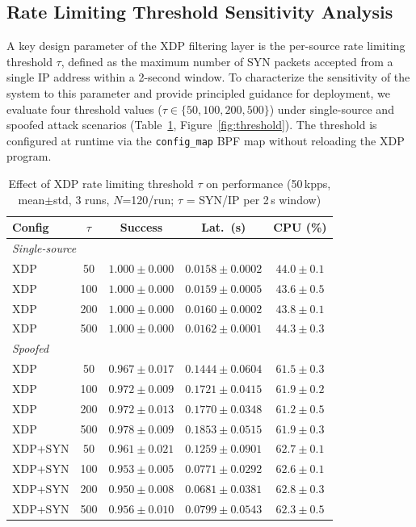 \documentclass[conference]{IEEEtran}
\begin{document}
\subsection{Rate Limiting Threshold Sensitivity Analysis}

A key design parameter of the XDP filtering layer is the per-source rate
limiting threshold $\tau$, defined as the maximum number of SYN packets
accepted from a single IP address within a 2-second window.
To characterize the sensitivity of the system to this parameter and provide
principled guidance for deployment, we evaluate four threshold values
($\tau \in \{50, 100, 200, 500\}$) under single-source and spoofed attack
scenarios (Table~\ref{tab:threshold}, Figure~\ref{fig:threshold}).
The threshold is configured at runtime via the \texttt{config\_map} BPF
map without reloading the XDP program.

\begin{table}[h]
\centering
\caption{Effect of XDP rate limiting threshold $\tau$ on performance
(50\,kpps, mean${\pm}$std, 3 runs, $N$=120/run;
$\tau$ = SYN/IP per 2\,s window)}
\label{tab:threshold}
\footnotesize
\setlength{\tabcolsep}{3pt}
\begin{tabular}{|l|c|c|c|c|}
\hline
\textbf{Config} & \textbf{$\tau$} & \textbf{Success} &
\textbf{Lat.\ (s)} & \textbf{CPU (\%)} \\
\hline
\multicolumn{5}{|l|}{\textit{Single-source}} \\
\hline
XDP &  50 & $1.000{\pm}0.000$ & $0.0158{\pm}0.0002$ & $44.0{\pm}0.1$ \\
XDP & 100 & $1.000{\pm}0.000$ & $0.0159{\pm}0.0005$ & $43.6{\pm}0.5$ \\
XDP & 200 & $1.000{\pm}0.000$ & $0.0160{\pm}0.0002$ & $43.8{\pm}0.1$ \\
XDP & 500 & $1.000{\pm}0.000$ & $0.0162{\pm}0.0001$ & $44.3{\pm}0.3$ \\
\hline
\multicolumn{5}{|l|}{\textit{Spoofed}} \\
\hline
XDP &  50 & $0.967{\pm}0.017$ & $0.1444{\pm}0.0604$ & $61.5{\pm}0.3$ \\
XDP & 100 & $0.972{\pm}0.009$ & $0.1721{\pm}0.0415$ & $61.9{\pm}0.2$ \\
XDP & 200 & $0.972{\pm}0.013$ & $0.1770{\pm}0.0348$ & $61.2{\pm}0.5$ \\
XDP & 500 & $0.978{\pm}0.009$ & $0.1853{\pm}0.0515$ & $61.9{\pm}0.3$ \\
XDP+SYN &  50 & $0.961{\pm}0.021$ & $0.1259{\pm}0.0901$ & $62.7{\pm}0.1$ \\
XDP+SYN & 100 & $0.953{\pm}0.005$ & $0.0771{\pm}0.0292$ & $62.6{\pm}0.1$ \\
XDP+SYN & 200 & $0.950{\pm}0.008$ & $0.0681{\pm}0.0381$ & $62.8{\pm}0.3$ \\
XDP+SYN & 500 & $0.956{\pm}0.010$ & $0.0799{\pm}0.0543$ & $62.3{\pm}0.5$ \\
\hline
\end{tabular}
\end{table}
\end{document}
